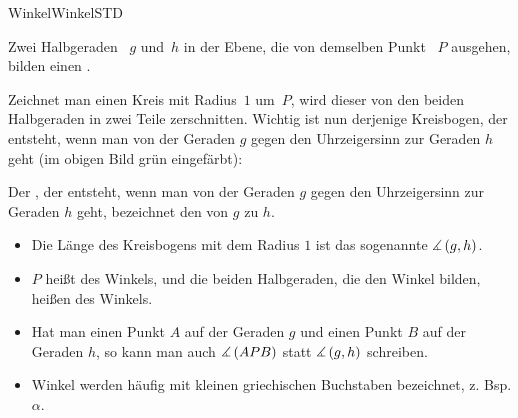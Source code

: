 \begin{MXContent}{Winkel}{Winkel}{STD}

Zwei Halbgeraden ~$g$ und~$h$ in der Ebene, die von demselben Punkt ~$P$ ausgehen, bilden einen .

\begin{center}
\end{center}

Zeichnet man einen Kreis mit Radius~$1$ um~$P$, wird dieser von den beiden Halbgeraden in zwei Teile zerschnitten. Wichtig ist nun derjenige Kreisbogen, der entsteht, wenn man von der Geraden $g$ gegen den Uhrzeigersinn zur Geraden $h$ geht (im obigen Bild gr\"un eingef\"arbt):

\begin{MInfo}%
Der , der entsteht, wenn man von der Geraden $g$ gegen den Uhrzeigersinn zur Geraden $h$ geht, bezeichnet den  von $g$ zu $h$.
  \begin{itemize}
    \item Die L\"ange des Kreisbogens mit dem Radius $1$ ist das sogenannte  $\measuredangle \left( g, h \right)$.
    \item $P$ hei\ss t  des Winkels, und die beiden Halbgeraden, die den Winkel bilden, hei\ss en  des Winkels.
    \item Hat man einen Punkt $A$ auf der Geraden $g$ und einen Punkt $B$ auf der Geraden $h$, so kann man auch $\measuredangle \left( A P B \right)$ statt $\measuredangle \left( g, h \right)$ schreiben.
    \item Winkel werden h\"aufig mit kleinen griechischen Buchstaben bezeichnet, z. Bsp. $\alpha$.
  \end{itemize}
\end{MInfo}


\end{MXContent}
